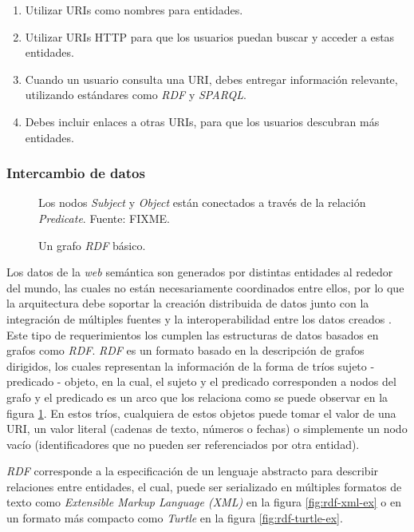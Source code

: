 \begin{enumerate}
    \item Utilizar URIs como nombres para entidades.
    \item Utilizar URIs HTTP para que los usuarios puedan buscar y acceder a
    estas entidades.
    \item Cuando un usuario consulta una URI, debes entregar información
    relevante, utilizando estándares como \textit{RDF} y \textit{SPARQL}.
    \item Debes incluir enlaces a otras URIs, para que los usuarios descubran
    más entidades.
\end{enumerate}

\subsubsection{Intercambio de datos}
\label{sec:intercambio-datos}

\begin{figure}
    \centering
    
    \caption{Un grafo \textit{RDF} básico.} Los nodos \textit{Subject} y
    \textit{Object} están conectados a través de la relación \textit{Predicate}.
    Fuente: FIXME.
    \label{fig:rdf-graph1}
\end{figure}

Los datos de la \textit{web} semántica son generados por distintas entidades al
rededor del mundo, las cuales no están necesariamente coordinados entre ellos,
por lo que la arquitectura debe soportar la creación distribuida de datos junto
con la integración de múltiples fuentes y la interoperabilidad entre los datos
creados \cite{bizer2011linked}. Este tipo de requerimientos los cumplen las
estructuras de datos basados en grafos como \textit{RDF}. \textit{RDF} es un
formato basado en la descripción de grafos dirigidos, los cuales representan la
información de la forma de tríos sujeto - predicado - objeto, en la cual, el
sujeto y el predicado corresponden a nodos del grafo y el predicado es un arco
que los relaciona como se puede observar en la figura \ref{fig:rdf-graph1}. En
estos tríos, cualquiera de estos objetos puede tomar el valor de una URI, un
valor literal (cadenas de texto, números o fechas) o simplemente un nodo vacío
(identificadores que no pueden ser referenciados por otra entidad).

\textit{RDF} corresponde a la especificación de un lenguaje abstracto para
describir relaciones entre entidades, el cual, puede ser serializado en
múltiples formatos de texto como \textit{Extensible Markup Language (XML)}
\cite{beckett2004rdf} en la figura \ref{fig:rdf-xml-ex} o en un formato más
compacto como \textit{Turtle} \cite{beckett2014rdf} en la figura
\ref{fig:rdf-turtle-ex}.


